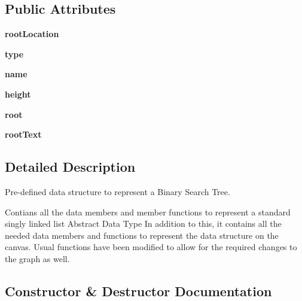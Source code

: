 \subsection*{Public Attributes}
\begin{DoxyCompactItemize}
\item 
\mbox{\label{class_binary_search_tree_1_1_binary_search_tree_a399ad4c8ba4b21962841a0895f4933a5}} 
{\bfseries root\+Location}
\item 
\mbox{\label{class_binary_search_tree_1_1_binary_search_tree_a28336f9c105f55dd0242225f94491a08}} 
{\bfseries type}
\item 
\mbox{\label{class_binary_search_tree_1_1_binary_search_tree_a507e958f649521d8d853007eefe3149b}} 
{\bfseries name}
\item 
\mbox{\label{class_binary_search_tree_1_1_binary_search_tree_a8bb002fc1b00983a2512240378a5ccc2}} 
{\bfseries height}
\item 
\mbox{\label{class_binary_search_tree_1_1_binary_search_tree_a4aa0ee481a5c399dc220c4c2284c7884}} 
{\bfseries root}
\item 
\mbox{\label{class_binary_search_tree_1_1_binary_search_tree_af6103954606e866294ab429e5b24aa01}} 
{\bfseries root\+Text}
\end{DoxyCompactItemize}


\subsection{Detailed Description}
Pre-\/defined data structure to represent a Binary Search Tree. 

Contians all the data members and member functions to represent a standard singly linked list Abstract Data Type In addition to this, it contains all the needed data members and functions to represent the data structure on the canvas. Usual functions have been modified to allow for the required changes to the graph as well. 

\subsection{Constructor \& Destructor Documentation}
\mbox{\label{class_binary_search_tree_1_1_binary_search_tree_a427e86bf2d372a1b518489843bc85103}} 

